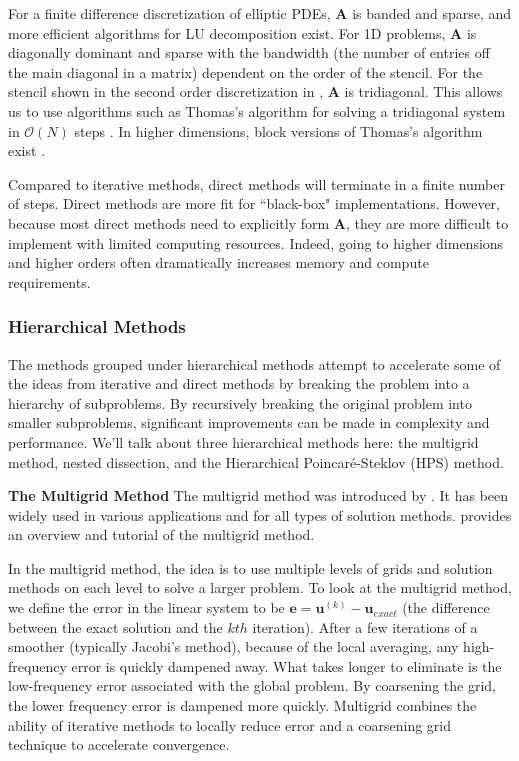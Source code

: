 For a finite difference discretization of elliptic PDEs, $\textbf{A}$ is banded and sparse, and more efficient algorithms for LU decomposition exist. For 1D problems, $\textbf{A}$ is diagonally dominant and sparse with the bandwidth (the number of entries off the main diagonal in a matrix) dependent on the order of the stencil. For the stencil shown in the second order discretization in , $\textbf{A}$ is tridiagonal. This allows us to use algorithms such as Thomas's algorithm for solving a tridiagonal system in $\mathcal{O}(N)$ steps \citep{higham2002accuracy}. In higher dimensions, block versions of Thomas's algorithm exist \citep{quarteroni2010numerical}.

Compared to iterative methods, direct methods will terminate in a finite number of steps. Direct methods are more fit for ``black-box" implementations. However, because most direct methods need to explicitly form $\textbf{A}$, they are more difficult to implement with limited computing resources. Indeed, going to higher dimensions and higher orders often dramatically increases memory and compute requirements.

\subsubsection{Hierarchical Methods}
\label{sub:hierarchical-methods}

The methods grouped under hierarchical methods attempt to accelerate some of the ideas from iterative and direct methods by breaking the problem into a hierarchy of subproblems. By recursively breaking the original problem into smaller subproblems, significant improvements can be made in complexity and performance. We'll talk about three hierarchical methods here: the multigrid method, nested dissection, and the Hierarchical Poincaré-Steklov (HPS) method.


{\bf The Multigrid Method}
The multigrid method was introduced by \cite{brandt1977multi}. It has been widely used in various applications and for all types of solution methods. \cite{briggs2000multigrid} provides an overview and tutorial of the multigrid method.

In the multigrid method, the idea is to use multiple levels of grids and solution methods on each level to solve a larger problem. To look at the multigrid method, we define the error in the linear system to be $\textbf{e} = \textbf{u}^{(k)} - \textbf{u}_{exact}$ (the difference between the exact solution and the $kth$ iteration). After a few iterations of a smoother (typically Jacobi's method), because of the local averaging, any high-frequency error is quickly dampened away. What takes longer to eliminate is the low-frequency error associated with the global problem. By coarsening the grid, the lower frequency error is dampened more quickly. Multigrid combines the ability of iterative methods to locally reduce error and a coarsening grid technique to accelerate convergence.

